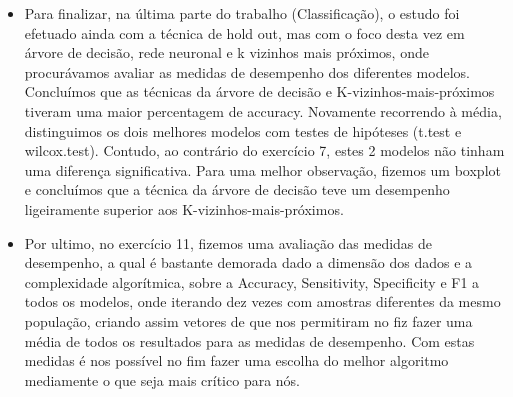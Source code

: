 \begin{itemize}
\item Para finalizar, na última parte do trabalho (Classificação), o estudo foi efetuado ainda com a técnica de hold out, mas com o foco desta vez em árvore de decisão, rede neuronal e k vizinhos mais próximos, onde procurávamos avaliar as medidas de desempenho dos diferentes modelos. Concluímos que as técnicas da árvore de decisão e K-vizinhos-mais-próximos tiveram uma maior percentagem de accuracy. Novamente recorrendo à média, distinguimos os dois melhores modelos com testes de hipóteses (t.test e wilcox.test). Contudo, ao contrário do exercício 7, estes 2 modelos não tinham uma diferença significativa. Para uma melhor observação, fizemos um boxplot e concluímos que a técnica da árvore de decisão teve um desempenho ligeiramente superior aos K-vizinhos-mais-próximos. 

\item Por ultimo, no exercício 11, fizemos uma avaliação das medidas de desempenho, a qual é bastante demorada dado a dimensão dos dados e a complexidade algorítmica, sobre a Accuracy, Sensitivity, Specificity e F1 a todos os modelos, onde iterando dez vezes com amostras diferentes da mesmo população, criando assim vetores de que nos permitiram no fiz fazer uma média de todos os resultados para as medidas de desempenho. Com estas medidas é nos possível no fim fazer uma escolha do melhor algoritmo mediamente o que seja mais crítico para nós.

\end{itemize}
